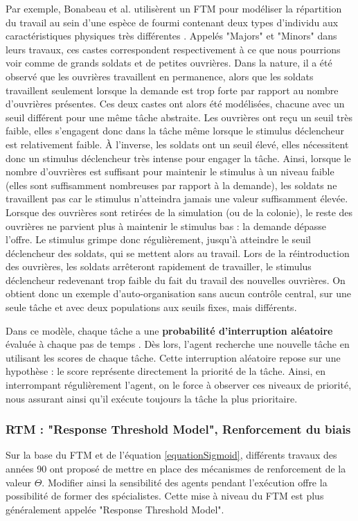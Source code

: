         Par exemple, Bonabeau et al. \cite{bonabeau_quantitative_1996} utilisèrent un FTM pour modéliser la répartition du travail au sein d'une espèce de fourmi contenant deux types d'individu aux caractéristiques physiques très différentes \cite{wilson_relation_1984}. Appelés "Majors" et "Minors" dans leurs travaux, ces castes correspondent respectivement à ce que nous pourrions voir comme de grands soldats et de petites ouvrières. Dans la nature, il a été observé que les ouvrières travaillent en permanence, alors que les soldats travaillent seulement lorsque la demande est trop forte par rapport au nombre d'ouvrières présentes. Ces deux castes ont alors été modélisées, chacune avec un seuil différent pour une même tâche abstraite. 
        Les ouvrières ont reçu un seuil très faible, elles s'engagent donc dans la tâche même lorsque le stimulus déclencheur est relativement faible. À l'inverse, les soldats ont un seuil élevé, elles nécessitent donc un stimulus déclencheur très intense pour engager la tâche. Ainsi, lorsque le nombre d'ouvrières est suffisant pour maintenir le stimulus à un niveau faible (elles sont suffisamment nombreuses par rapport à la demande), les soldats ne travaillent pas car le stimulus n'atteindra jamais une valeur suffisamment élevée. Lorsque des ouvrières sont retirées de la simulation (ou de la colonie), le reste des ouvrières ne parvient plus à maintenir le stimulus bas : la demande dépasse l'offre. Le stimulus grimpe donc régulièrement, jusqu'à atteindre le seuil déclencheur des soldats, qui se mettent alors au travail. Lors de la réintroduction des ouvrières, les soldats arrêteront rapidement de travailler, le stimulus déclencheur redevenant trop faible du fait du travail des nouvelles ouvrières. On obtient donc un exemple d'auto-organisation sans aucun contrôle central, sur une seule tâche et avec deux populations aux seuils fixes, mais différents.
		
		Dans ce modèle, chaque tâche a une \textbf{probabilité d'interruption aléatoire} évaluée à chaque pas de temps \cite{gautrais_emergent_2002}. Dès lors, l'agent recherche une nouvelle tâche en utilisant les scores de chaque tâche. Cette interruption aléatoire repose sur une hypothèse : le score représente directement la priorité de la tâche. Ainsi, en interrompant régulièrement l'agent, on le force à observer ces niveaux de priorité, nous assurant ainsi qu'il exécute toujours la tâche la plus prioritaire.
        
        \subsubsection{RTM : "Response Threshold Model", Renforcement du biais}
        Sur la base du FTM et de l'équation \ref{equationSigmoid}, différents travaux des années 90 \cite{theraulaz_response_1998,drogoul_multi-agent_1992, gautrais_emergent_2002} ont proposé de mettre en place des mécanismes de renforcement de la valeur $\Theta$. Modifier ainsi la sensibilité des agents pendant l'exécution offre la possibilité de former des spécialistes. Cette mise à niveau du FTM est plus généralement appelée "Response Threshold Model".
        
